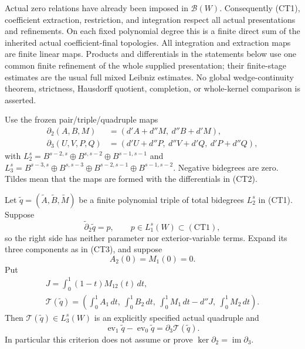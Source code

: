 Actual zero relations have already been imposed in $\mathscr B(W)$.
Consequently (CT1), coefficient extraction, restriction, and integration
respect all actual presentations and refinements.  On each fixed
polynomial degree this is a finite direct sum of the inherited actual
coefficient-final topologies.  All integration and extraction maps
are finite linear maps.  Products and differentials in the statements
below use one common finite refinement of the whole supplied
presentation; their finite-stage estimates are the usual full mixed
Leibniz estimates.  No global wedge-continuity theorem, strictness,
Hausdorff quotient, completion, or whole-kernel comparison is asserted.

Use the frozen pair/triple/quadruple maps
\[
 \begin{split}
 \partial_2(A,B,M)&=(d'A+d''M,\ d''B+d'M),\\
 \partial_3(U,V,P,Q)&=(d'U+d''P,\ d''V+d'Q,\ d'P+d''Q),
 \end{split}
 \tag{CT4}
\]
with $L_2^s=B^{s-2,s}\oplus B^{s,s-2}\oplus B^{s-1,s-1}$ and
$L_3^s=B^{s-3,s}\oplus B^{s,s-3}\oplus B^{s-2,s-1}
\oplus B^{s-1,s-2}$.  Negative bidegrees are zero.  Tildes mean
that the maps are formed with the differentials in (CT2).

\begin{theorem}
Let $\widetilde q=(\widetilde A,\widetilde B,\widetilde M)$ be
a finite polynomial triple of total bidegrees $L_2^s$ in (CT1).
Suppose
\[
       \widetilde\partial_2\widetilde q=p,
       \qquad p\in L_1^s(W)\subset(\mathrm{CT1}),
 \tag{CT5}
\]
so the right side has neither parameter nor exterior-variable terms.
Expand its three components as in (CT3), and suppose
\[
                    A_2(0)=M_1(0)=0.
 \tag{CT6}
\]
Put
\[
 \begin{gathered}
 J=\int_0^1(1-t)M_{12}(t)\,dt,\\
 \mathcal T(\widetilde q)=
 \left(\int_0^1 A_1\,dt,\ \int_0^1 B_2\,dt,\
       \int_0^1 M_1\,dt-d''J,\ \int_0^1 M_2\,dt\right).
 \end{gathered}
 \tag{CT7}
\]
Then $\mathcal T(\widetilde q)\in L_3^s(W)$ is an explicitly
specified actual quadruple and
\[
       \operatorname{ev}_1\widetilde q
        -\operatorname{ev}_0\widetilde q
                    =\partial_3\mathcal T(\widetilde q).
 \tag{CT8}
\]
In particular this criterion does not assume or prove
$\ker\partial_2=\operatorname{im}\partial_3$.
\end{theorem}


